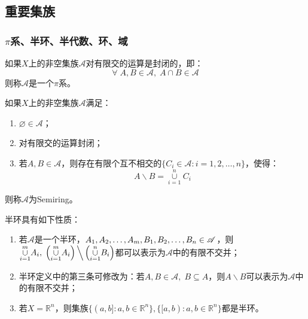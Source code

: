 \subsection{重要集族}
\subsubsection{$\pi$系、半环、半代数、环、域}
\begin{definition}
	如果$X$上的非空集族$\mathscr{A}$对有限交的运算是封闭的，即：
	\begin{equation*}
		\forall\;A,B\in\mathscr{A},\;A\cap B\in\mathscr{A}
	\end{equation*}
	则称$\mathscr{A}$是一个$\pi$系。
\end{definition}
\begin{definition}
	如果$X$上的非空集族$\mathscr{A}$满足：
	\begin{enumerate}
		\item $\varnothing\in\mathscr{A}$；
		\item 对有限交的运算封闭；
		\item 若$A,B\in\mathscr{A}$，则存在有限个互不相交的$\{C_i\in\mathscr{A}:i=1,2,\dots,n\}$，使得：
		\begin{equation*}
			A\backslash B=\underset{i=1}{\overset{n}{\cup}}C_i
		\end{equation*}
	\end{enumerate}
	则称$\mathscr{A}$为\gls{Semiring}。
\end{definition}
\begin{property}\label{prop:Semiring}
	半环具有如下性质：
	\begin{enumerate}
		\item 若$\mathscr{A}$是一个半环，$A_1, A_2, \dots, A_{m},B_1, B_2, \dots, B_{n}\in\mathscr{A}$，则$\underset{i=1}{\overset{m}{\cup}}A_i,\;\left(\underset{i=1}{\overset{m}{\cup}}A_i\right)\Big\backslash\left(\underset{i=1}{\overset{n}{\cup}}B_i\right)$都可以表示为$\mathscr{A}$中的有限不交并；
		\item 半环定义中的第三条可修改为：若$A,B\in\mathscr{A},\;B\subseteq A$，则$A\backslash B$可以表示为$\mathscr{A}$中的有限不交并；
		\item 若$X=\mathbb{R}^{n}$，则集族$\{(a,b]:a,b\in\mathbb{R}^{n}\},\{[a,b):a,b\in\mathbb{R}^{n}\}$都是半环。
	\end{enumerate}
\end{property}
